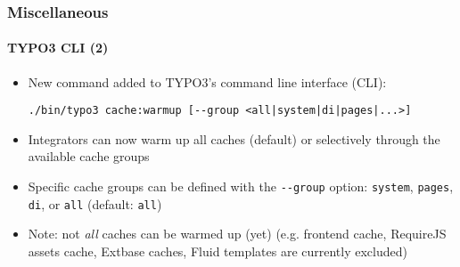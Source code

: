 %

\begin{frame}[fragile]
	\frametitle{Miscellaneous}
	\framesubtitle{TYPO3 CLI (2)}


	\begin{itemize}
		\item New command added to TYPO3's command line interface (CLI):
\begin{lstlisting}
./bin/typo3 cache:warmup [--group <all|system|di|pages|...>]
\end{lstlisting}
		\item Integrators can now warm up all caches (default) or selectively
			through the available cache groups
		\item Specific cache groups can be defined with the
			\texttt{-}\texttt{-group} option:\newline
			\small\texttt{system}, \texttt{pages}, \texttt{di}, or \texttt{all} (default: \texttt{all})\normalsize
		\item Note: not \textit{all} caches can be warmed up (yet)\newline
			\small(e.g. frontend cache, RequireJS assets cache, Extbase caches,
				Fluid templates are currently excluded)\normalsize
	\end{itemize}
\end{frame}

